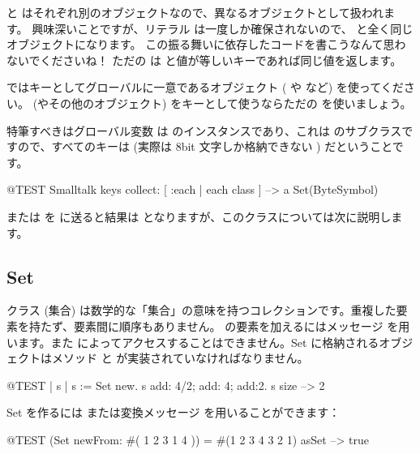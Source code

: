 \documentclass[a4paper,10pt,twoside]{book}
\begin{document}
\noindent
{} と  はそれぞれ別のオブジェクトなので、異なるオブジェクトとして扱われます。
興味深いことですが、リテラル \mbox{} は一度しか確保されないので、 と全く同じオブジェクトになります。
この振る舞いに依存したコードを書こうなんて思わないでくださいね！
ただの  は  と値が等しいキーであれば同じ値を返します。

 ではキーとしてグローバルに一意であるオブジェクト ( や  など) を使ってください。 (やその他のオブジェクト) をキーとして使うならただの  を使いましょう。

特筆すべきはグローバル変数  は  のインスタンスであり、これは  のサブクラスですので、すべてのキーは  (実際は 8bit 文字しか格納できない ) だということです。

\begin{code}{@TEST}
Smalltalk keys collect: [ :each | each class ] --> a Set(ByteSymbol)
\end{code}
\noindent
{} または  を  に送ると結果は  となりますが、このクラスについては次に説明します。

\subsection{Set}
クラス  (集合) は数学的な「集合」の意味を持つコレクションです。\ie 重複した要素を持たず、要素間に順序もありません。 の要素を加えるにはメッセージ  を用います。また  によってアクセスすることはできません。Set に格納されるオブジェクトはメソッド  と \ct{=} が実装されていなければなりません。

\begin{code}{@TEST | s | }
s := Set new.
s add: 4/2; add: 4; add:2.
s size --> 2
\end{code}

Set を作るには  または変換メッセージ  を用いることができます：

\begin{code}{@TEST}
(Set newFrom: #( 1 2 3 1 4 )) = #(1 2 3 4 3 2 1) asSet --> true
\end{code}
\end{document}
